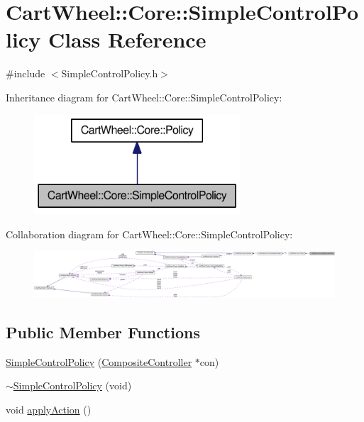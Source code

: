 \hypertarget{classCartWheel_1_1Core_1_1SimpleControlPolicy}{
\section{CartWheel::Core::SimpleControlPolicy Class Reference}
\label{classCartWheel_1_1Core_1_1SimpleControlPolicy}
}


{\ttfamily \#include $<$SimpleControlPolicy.h$>$}



Inheritance diagram for CartWheel::Core::SimpleControlPolicy:\nopagebreak
\begin{figure}[H]
\begin{center}
\leavevmode
\includegraphics[width=218pt]{classCartWheel_1_1Core_1_1SimpleControlPolicy__inherit__graph}
\end{center}
\end{figure}


Collaboration diagram for CartWheel::Core::SimpleControlPolicy:\nopagebreak
\begin{figure}[H]
\begin{center}
\leavevmode
\includegraphics[width=400pt]{classCartWheel_1_1Core_1_1SimpleControlPolicy__coll__graph}
\end{center}
\end{figure}
\subsection*{Public Member Functions}
\begin{DoxyCompactItemize}
\item 
\hyperlink{classCartWheel_1_1Core_1_1SimpleControlPolicy_a4564f02bdcf4163997cf4984a4acec9d}{SimpleControlPolicy} (\hyperlink{classCartWheel_1_1Core_1_1CompositeController}{CompositeController} $\ast$con)
\item 
\hyperlink{classCartWheel_1_1Core_1_1SimpleControlPolicy_a2306ebfbe0a4ceba56e7e3e4408f898e}{$\sim$SimpleControlPolicy} (void)
\item 
void \hyperlink{classCartWheel_1_1Core_1_1SimpleControlPolicy_a29c91dcd0c95be19588a4d93412f3c3a}{applyAction} ()
\end{DoxyCompactItemize}
